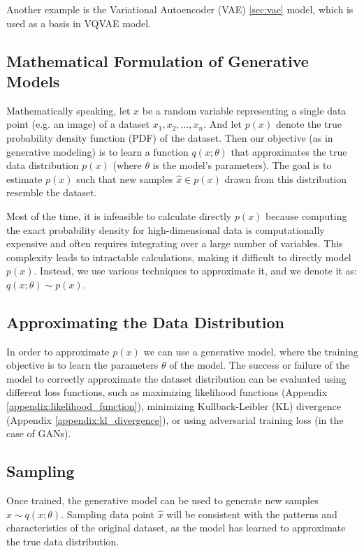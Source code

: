 Another example is the Variational Autoencoder (VAE) \cite{vae} \ref{sec:vae} model, which is used as a basis in VQVAE model. 

\subsection{Mathematical Formulation of Generative Models}
Mathematically speaking, let $x$ be a random variable representing a single data point (e.g. an image) of a dataset ${x_1,x_2,...,x_n}$. And let $p(x)$ denote the true probability density function (PDF) of the dataset. Then our objective (as in generative modeling) is to learn a function $q(x;\theta)$ that approximates the true data distribution $p(x)$ (where $\theta$ is the model's parameters). The goal is to estimate $p(x)$ such that new samples $\hat{x} \in p(x)$ drawn from this distribution resemble the dataset.

Most of the time, it is infeasible to calculate directly $p(x)$ because computing the exact probability density for high-dimensional data is computationally expensive and often requires integrating over a large number of variables. This complexity leads to intractable calculations, making it difficult to directly model $p(x)$. Instead, we use various techniques to approximate it, and we denote it as: $q(x;\theta) \sim p(x)$.

\subsection{Approximating the Data Distribution}

In order to approximate $p(x)$ we can use a generative model, where the training objective is to learn the parameters $\theta$ of the model. The success or failure of the model to correctly approximate the dataset distribution can be evaluated using different loss functions, such as maximizing likelihood functions (Appendix \ref{appendix:likelihood_function}), minimizing Kullback-Leibler (KL) divergence (Appendix \ref{appendix:kl_divergence}), or using adversarial training loss (in the case of GANs).

\subsection{Sampling}

Once trained, the generative model can be used to generate new samples $\hat{x} \sim q(x;\theta)$. Sampling data point $\hat{x}$ will be consistent with the patterns and characteristics of the original dataset, as the model has learned to approximate the true data distribution.

